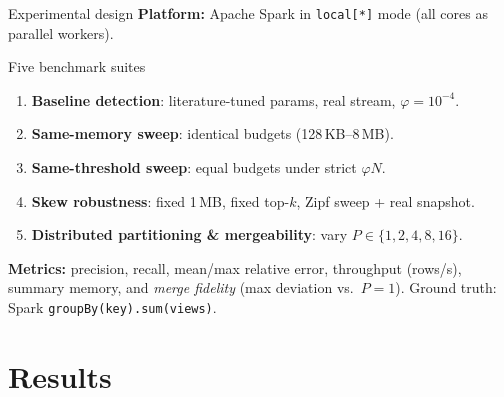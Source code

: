 \documentclass[11pt,aspectratio=169]{beamer}
\begin{document}
\begin{frame}{Experimental design}
  \textbf{Platform:} Apache Spark \cite{zahariaApacheSparkUnified2016} in
  \texttt{local[*]} mode (all cores as parallel workers).
  \begin{block}{Five benchmark suites}
    \begin{enumerate}
      \item \textbf{Baseline detection}: literature-tuned params, real stream, $\varphi=10^{-4}$.
      \item \textbf{Same-memory sweep}: identical budgets (128\,KB--8\,MB).
      \item \textbf{Same-threshold sweep}: equal budgets under strict $\varphi N$.
      \item \textbf{Skew robustness}: fixed 1\,MB, fixed top-$k$, Zipf sweep + real snapshot.
      \item \textbf{Distributed partitioning \& mergeability}: vary $P\in\{1,2,4,8,16\}$.
    \end{enumerate}
  \end{block}
  \textbf{Metrics:} precision, recall, mean/max relative error, throughput
  (rows/s), summary memory, and \emph{merge fidelity} (max deviation vs.\ $P{=}1$).
  Ground truth: Spark \texttt{groupBy(key).sum(views)}.
\end{frame}

\section{Results}
\end{document}
